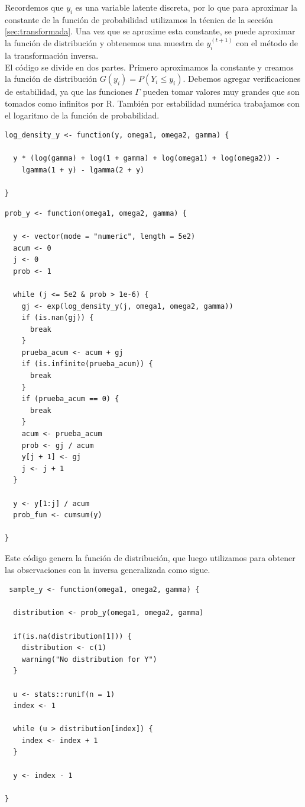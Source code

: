 \documentclass[11pt,a4paper]{article}
\begin{document}
Recordemos que $y_i$ es una variable latente discreta, por lo que para aproximar la constante de la función de probabilidad utilizamos la técnica de la sección \ref{sec:transformada}. Una vez que se aproxime esta constante, se puede aproximar la función de distribución y obtenemos una muestra de $y_i^{(t+1)}$ con el método de la transformación inversa.\\

El código se divide en dos partes. Primero aproximamos la constante y creamos la función de distribución $G(y_i) = P(Y_i \leq y_i)$. Debemos agregar verificaciones de estabilidad, ya que las funciones $\Gamma$ pueden tomar valores muy grandes que son tomados como infinitos por R. También por estabilidad numérica trabajamos con el logaritmo de la función de probabilidad.\\

\begin{lstlisting}
log_density_y <- function(y, omega1, omega2, gamma) {

  y * (log(gamma) + log(1 + gamma) + log(omega1) + log(omega2)) -
    lgamma(1 + y) - lgamma(2 + y)

}
\end{lstlisting}

\begin{lstlisting}
prob_y <- function(omega1, omega2, gamma) {

  y <- vector(mode = "numeric", length = 5e2)
  acum <- 0
  j <- 0
  prob <- 1

  while (j <= 5e2 & prob > 1e-6) {
    gj <- exp(log_density_y(j, omega1, omega2, gamma))
    if (is.nan(gj)) {
      break
    }
    prueba_acum <- acum + gj
    if (is.infinite(prueba_acum)) {
      break
    }
    if (prueba_acum == 0) {
      break
    }
    acum <- prueba_acum
    prob <- gj / acum
    y[j + 1] <- gj
    j <- j + 1
  }

  y <- y[1:j] / acum
  prob_fun <- cumsum(y)

}
\end{lstlisting}

Este código genera la función de distribución, que luego utilizamos para obtener las observaciones con la inversa generalizada como sigue.\\

\begin{lstlisting}
 sample_y <- function(omega1, omega2, gamma) {

  distribution <- prob_y(omega1, omega2, gamma)

  if(is.na(distribution[1])) {
    distribution <- c(1)
    warning("No distribution for Y")
  }

  u <- stats::runif(n = 1)
  index <- 1

  while (u > distribution[index]) {
    index <- index + 1
  }

  y <- index - 1

}
\end{lstlisting}
\end{document}
